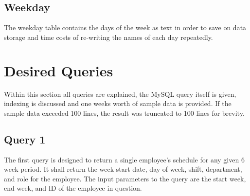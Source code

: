\documentclass[letter,12pt]{texMemo}
\begin{document}
	\subsection*{Weekday}
		The weekday table contains the days of the week as text in order to save on data storage and time costs of re-writing the names of each day repeatedly.
		

\newpage
\section*{Desired Queries}
Within this section all queries are explained, the MySQL query itself is given, indexing is discussed and one weeks worth of sample data is provided. If the sample data exceeded 100 lines, the result was truncated to 100 lines for brevity.
\subsection*{Query 1}
The first query is designed to return a single employee's schedule for any given 6 week period. It shall return the week start date, day of week, shift, department, and role for the employee. The input parameters to the query are the start week, end week, and ID of the employee in question.
\end{document}
